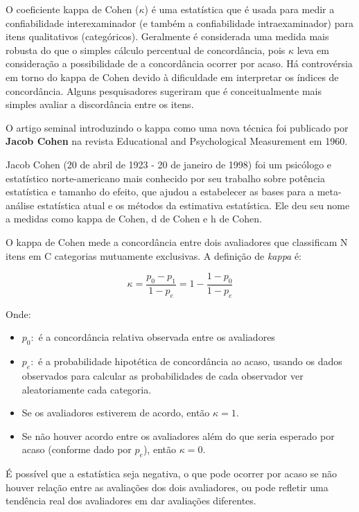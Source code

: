 \documentclass[
  letterpaper,
  DIV=11,
  numbers=noendperiod]{scrreprt}
\providecommand{\tightlist}{%
  \setlength{\itemsep}{0pt}\setlength{\parskip}{0pt}}\usepackage{longtable,booktabs,array}
\begin{document}
O coeficiente kappa de Cohen (\(κ\)) é uma estatística que é usada para
medir a confiabilidade interexaminador (e também a confiabilidade
intraexaminador) para itens qualitativos (categóricos). Geralmente é
considerada uma medida mais robusta do que o simples cálculo percentual
de concordância, pois \(κ\) leva em consideração a possibilidade de a
concordância ocorrer por acaso. Há controvérsia em torno do kappa de
Cohen devido à dificuldade em interpretar os índices de concordância.
Alguns pesquisadores sugeriram que é conceitualmente mais simples
avaliar a discordância entre os itens.

O artigo seminal introduzindo o kappa como uma nova técnica foi
publicado por \textbf{Jacob Cohen} na revista Educational and
Psychological Measurement em 1960.

Jacob Cohen (20 de abril de 1923 - 20 de janeiro de 1998) foi um
psicólogo e estatístico norte-americano mais conhecido por seu trabalho
sobre potência estatística e tamanho do efeito, que ajudou a estabelecer
as bases para a meta-análise estatística atual e os métodos da
estimativa estatística. Ele deu seu nome a medidas como kappa de Cohen,
d de Cohen e h de Cohen.

O kappa de Cohen mede a concordância entre dois avaliadores que
classificam N itens em C categorias mutuamente exclusivas. A definição
de \emph{kappa} é:

\[ \kappa = \frac{p_{0}-p_{1}}{1-p_{e}} = 1- \frac{1-p_{0}}{1-p_{e}}\]

Onde:

\begin{itemize}
\tightlist
\item
  \(p_{0}:\) é a concordância relativa observada entre os avaliadores
\item
  \(p_{e}:\) é a probabilidade hipotética de concordância ao acaso,
  usando os dados observados para calcular as probabilidades de cada
  observador ver aleatoriamente cada categoria.
\item
  Se os avaliadores estiverem de acordo, então \(\kappa = 1\).
\item
  Se não houver acordo entre os avaliadores além do que seria esperado
  por acaso (conforme dado por \(p_{e}\)), então \(\kappa = 0\).
\end{itemize}

É possível que a estatística seja negativa, o que pode ocorrer por acaso
se não houver relação entre as avaliações dos dois avaliadores, ou pode
refletir uma tendência real dos avaliadores em dar avaliações
diferentes.
\end{document}
